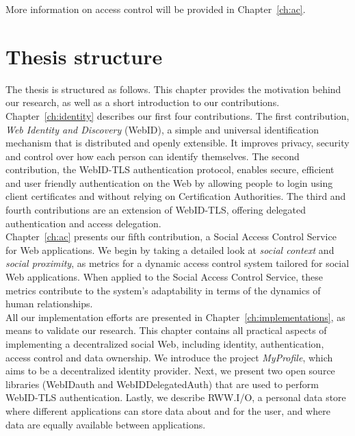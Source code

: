 More information on access control will be provided in Chapter~\ref{ch:ac}.

\section{Thesis structure}
\label{sec:intro-summary}
The thesis is structured as follows. This chapter provides the motivation behind our research, as well as a short introduction to our contributions.\\

Chapter~\ref{ch:identity} describes our first four contributions. The first contribution, \textit{Web Identity and Discovery} (WebID), a simple and universal identification mechanism that is distributed and openly extensible. It improves privacy, security and control over how each person can identify themselves. The second contribution, the WebID-TLS authentication protocol, enables secure, efficient and user friendly authentication on the Web by allowing people to login using client certificates and without relying on Certification Authorities. The third and fourth contributions are an extension of WebID-TLS, offering delegated authentication and access delegation.\\

Chapter~\ref{ch:ac} presents our fifth contribution, a Social Access Control Service for Web applications. We begin by taking a detailed look at \textit{social context} and \textit{social proximity}, as metrics for a dynamic access control system tailored for social Web applications. When applied to the Social Access Control Service, these metrics contribute to the system's adaptability in terms of the dynamics of human relationships.\\

All our implementation efforts are presented in Chapter~\ref{ch:implementations}, as means to validate our research. This chapter contains all practical aspects of implementing a decentralized social Web, including identity, authentication, access control and data ownership. We introduce the project \textit{MyProfile}, which aims to be a decentralized identity provider. Next, we present two open source libraries (WebIDauth and WebIDDelegatedAuth) that are used to perform WebID-TLS authentication. Lastly, we describe RWW.I/O, a personal data store where different applications can store data about and for the user, and where data are equally available between applications.\\

